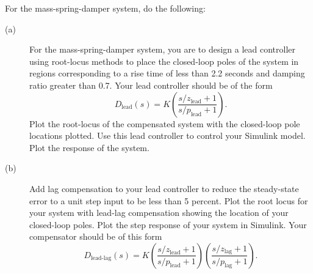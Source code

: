 For the mass-spring-damper system, do the following:
\begin{description}
\item[(a)]  For the mass-spring-damper system, you are to design a lead controller using root-locus methods to place the closed-loop poles of the system in regions corresponding to a rise time of less than 2.2 seconds and damping ratio greater than 0.7. Your lead controller should be of the form
\[
  D_{\text{lead}}(s) = K \left(\frac{s/z_{\text{lead}} + 1}{s/p_{\text{lead}} + 1} \right) .
\]
Plot the root-locus of the compensated system with the closed-loop pole locations plotted. Use this lead controller to control your Simulink model. Plot the response of the system.

\item[(b)]  Add lag compensation to your lead controller to reduce the steady-state error to a unit step input to be less than 5 percent. Plot the root locus for your system with lead-lag compensation showing the location of your closed-loop poles. Plot the step response of your system in Simulink. Your compensator should be of this form
\[
  D_{\text{lead-lag}}(s) = K \left(\frac{s/z_{\text{lead}} + 1}{s/p_{\text{lead}} + 1}\right)\left(\frac{s/z_{\text{lag}} + 1}{s/p_{\text{lag}} + 1} \right).
\]

\end{description}

